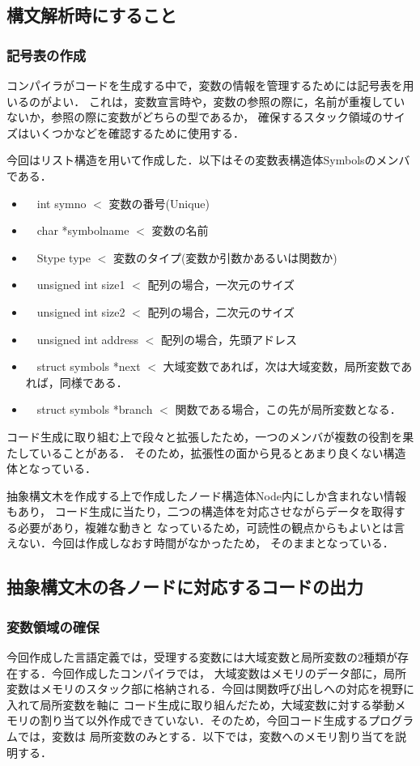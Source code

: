 \documentclass[a4paper,11pt]{jarticle}
\begin{document}
{\subsection{構文解析時にすること}
\subsubsection{記号表の作成}
コンパイラがコードを生成する中で，変数の情報を管理するためには記号表を用いるのがよい．
これは，変数宣言時や，変数の参照の際に，名前が重複していないか，参照の際に変数がどちらの型であるか，
確保するスタック領域のサイズはいくつかなどを確認するために使用する．

今回はリスト構造を用いて作成した．以下はその変数表構造体Symbolsのメンバである．
\begin{itemize}
\item　int          symno          $<$ 変数の番号(Unique)
\item　char         *symbolname    $<$ 変数の名前
\item　Stype        type           $<$ 変数のタイプ(変数か引数かあるいは関数か)
\item　unsigned int size1          $<$ 配列の場合，一次元のサイズ
\item　unsigned int size2          $<$ 配列の場合，二次元のサイズ
\item　unsigned int address        $<$ 配列の場合，先頭アドレス
\item　struct symbols *next        $<$ 大域変数であれば，次は大域変数，局所変数であれば，同様である．
\item　struct symbols *branch      $<$ 関数である場合，この先が局所変数となる．
\end{itemize}

コード生成に取り組む上で段々と拡張したため，一つのメンバが複数の役割を果たしていることがある．
そのため，拡張性の面から見るとあまり良くない構造体となっている．

抽象構文木を作成する上で作成したノード構造体Node内にしか含まれない情報もあり，
コード生成に当たり，二つの構造体を対応させながらデータを取得する必要があり，複雑な動きと
なっているため，可読性の観点からもよいとは言えない．今回は作成しなおす時間がなかったため，
そのままとなっている．


\subsection{抽象構文木の各ノードに対応するコードの出力}
\subsubsection{変数領域の確保}
今回作成した言語定義では，受理する変数には大域変数と局所変数の2種類が存在する．今回作成したコンパイラでは，
大域変数はメモリのデータ部に，局所変数はメモリのスタック部に格納される．今回は関数呼び出しへの対応を視野に入れて局所変数を軸に
コード生成に取り組んだため，大域変数に対する挙動メモリの割り当て以外作成できていない．そのため，今回コード生成するプログラムでは，変数は
局所変数のみとする．以下では，変数へのメモリ割り当てを説明する．

}
\end{document}
